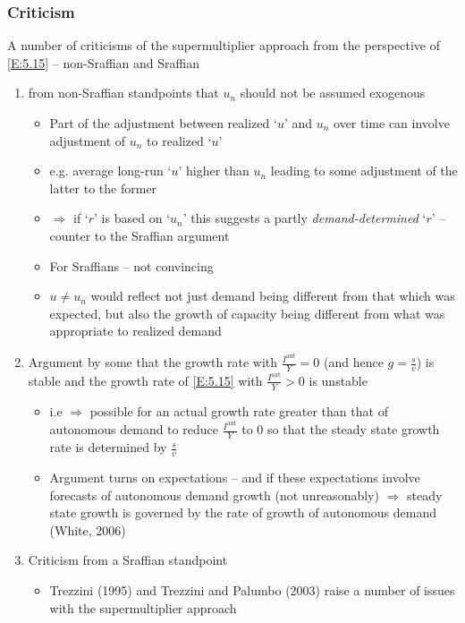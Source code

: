 \documentclass[a4paper,twoside]{article}
\numberwithin{equation}{section}
\numberwithin{figure}{section}
\begin{document}
\subsubsection{Criticism}
	A number of criticisms of the supermultiplier approach from the perspective of \cref{E:5.15} -- non-Sraffian and Sraffian
	\begin{enumerate}
		\item from non-Sraffian standpoints that \( u_n \) should not be assumed exogenous
		\begin{itemize}
			\item Part of the adjustment between realized `\( u \)' and \( u_n \) over time can involve adjustment of \( u_n \) to realized `\( u \)'
			\item e.g. average long-run `\( u \)' higher than \( u_n \) leading to some adjustment of the latter to the former
			\item \( \Rightarrow \) if `\( r \)' is based on `\( u_n \)' this suggests a partly \textit{demand-determined} `\( r \)' -- counter to the Sraffian argument
			\item For Sraffians -- not convincing
			\item \( u \neq u_n \) would reflect not just demand being different from that which was expected, but also the growth of capacity being different from what was appropriate to realized demand
		\end{itemize}
		\item Argument by some that the growth rate with \( \frac{I^\text{aut}}{Y} = 0 \) (and hence \( g = \frac{s}{v} \)) is stable and the growth rate of \cref{E:5.15} with \( \frac{I^\text{aut}}{Y} > 0 \) is unstable
		\begin{itemize}
			\item i.e \( \Rightarrow \) possible for an actual growth rate greater than that of autonomous demand to reduce \( \frac{I^\text{aut}}{Y} \) to 0 so that the steady state growth rate is determined by \( \frac{s}{v} \)
			\item Argument turns on expectations -- and if these expectations involve forecasts of autonomous demand growth (not unreasonably) \( \Rightarrow \) steady state growth is governed by the rate of growth of autonomous demand (White, 2006)
		\end{itemize}
		\item Criticism from a Sraffian standpoint
		\begin{itemize}
			\item Trezzini (1995) and Trezzini and Palumbo (2003) raise a number of issues with the supermultiplier approach

\end{itemize}
\end{enumerate}
\end{document}
